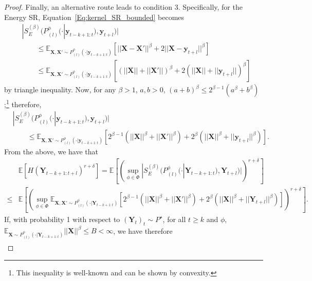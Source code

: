 \documentclass[twoside,11pt]{article}
\newcommand{\E}{\mathbb{E}}
\newcommand{\ddobs}{\mathbf{y}}
\newcommand{\Ddsim}{\mathbf{X}}
\newcommand{\Ddobs}{\mathbf{Y}}
\begin{document}
\begin{proof}
		Finally, an alternative route leads to condition 3. Specifically, for the Energy SR, Equation~\eqref{Eq:kernel_SR_bounded} becomes 
		\begin{equation}\label{Eq:eng_SR_bounded}
		\begin{aligned}
		&|S_E^{(\beta)}(P^\phi_{(l)}(\cdot|\ddobs_{t-k+1:t}), \ddobs_{t+l})| \\
		&\qquad\le \E_{\Ddsim,\Ddsim'\sim P^\phi_{(l)}(\cdot|\ddobs_{t-k+1:t})}[||\Ddsim-\Ddsim'||^\beta + 2||\Ddsim- \ddobs_{t+l}||^\beta]\\
		&\qquad \le \E_{\Ddsim,\Ddsim'\sim P^\phi_{(l)}(\cdot|\ddobs_{t-k+1:t})}[(||\Ddsim||+||\Ddsim'||)^\beta + 2(||\Ddsim||+||\ddobs_{t+l}||)^\beta]
		\end{aligned}
		\end{equation}
		by triangle inequality. Now, for any $ \beta>1 $, $ a,b>0 $, $ (a+b)^\beta\le2^{\beta-1}(a^\beta+b^\beta) $;\footnote{This inequality is well-known and can be shown by convexity.} therefore, 
		\begin{equation}\label{}
		\begin{aligned}
		&|S_E^{(\beta)}(P^\phi_{(l)}(\cdot|\ddobs_{t-k+1:t}), \ddobs_{t+l})| \\
		&\qquad  \le \E_{\Ddsim,\Ddsim'\sim P^\phi_{(l)}(\cdot|\ddobs_{t-k+1:t})}[2^{\beta-1}(||\Ddsim||^\beta+||\Ddsim'||^\beta)+ 2^\beta(||\Ddsim||^\beta+||\ddobs_{t+l}||^\beta)].
		\end{aligned}
		\end{equation}
		From the above, we have that 
		\begin{equation}\label{key}
		\begin{aligned}
		&\E\left[H(\Ddobs_{t-k+1:t+l})^{r+\delta}\right] = \E\left[\left( \sup_{\phi \in \Phi } |S_E^{(\beta)}(P^\phi_{(l)}(\cdot|\Ddobs_{t-k+1:t}), \Ddobs_{t+l})| \right)^{r+\delta}\right]\\
		\le &\E\left[\left( \sup_{\phi \in \Phi } \E_{\Ddsim,\Ddsim'\sim P^\phi_{(l)}(\cdot|\Ddobs_{t-k+1:t})}[2^{\beta-1}(||\Ddsim||^\beta+||\Ddsim'||^\beta)+ 2^\beta(||\Ddsim||^\beta+||\Ddobs_{t+l}||^\beta)] \right)^{r+\delta}\right].
		\end{aligned}
		\end{equation}
		If, with probability 1 with respect to $ (\Ddobs_t)_t\sim P^\star $, for all $ t\ge k $ and $ \phi $, $ \E_{\Ddsim\sim P^\phi_{(l)}(\cdot|\Ddobs_{t-k+1:t})}||\Ddsim||^\beta \le B<\infty$, we have therefore
		\begin{equation}\label{key}
		\begin{aligned}

\end{aligned}
\end{equation}
\end{proof}
\end{document}

